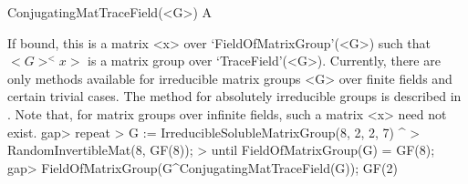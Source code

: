 \>ConjugatingMatTraceField(<G>) A

If bound, this is a matrix <x> over `FieldOfMatrixGroup'(<G>) such that
$<G>^<x>$ is a  matrix group over `TraceField'(<G>). Currently, there are
only methods available for irreducible matrix groups <G> over finite fields
and certain trivial cases.
The method for absolutely irreducible groups is described in
\cite{GH}. 
Note that, for matrix groups over infinite fields, such a matrix <x> 
need not exist.
\beginexample
gap> repeat
>       G := IrreducibleSolubleMatrixGroup(8, 2, 2, 7) ^ 
>                RandomInvertibleMat(8, GF(8));
>    until FieldOfMatrixGroup(G) = GF(8);
gap> FieldOfMatrixGroup(G^ConjugatingMatTraceField(G));
GF(2)
\endexample


